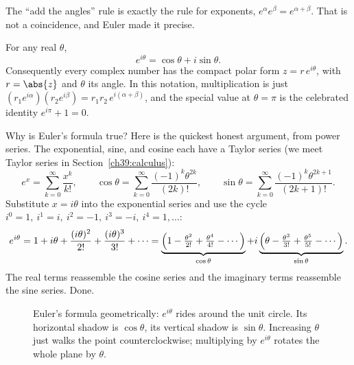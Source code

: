 The ``add the angles'' rule is exactly the rule for exponents, $e^\alpha e^\beta = e^{\alpha+\beta}$.
That is not a coincidence, and Euler made it precise.

\begin{formalbox}
For any real $\theta$,
\[
e^{i\theta} = \cos\theta + i\sin\theta.
\]
Consequently every complex number has the compact polar form $z = r\,e^{i\theta}$, with $r =
\abs{z}$ and $\theta$ its angle. In this notation, multiplication is just
$ (r_1 e^{i\alpha})(r_2 e^{i\beta}) = r_1 r_2\, e^{i(\alpha+\beta)}$, and the special value at
$\theta = \pi$ is the celebrated identity $e^{i\pi} + 1 = 0$.
\end{formalbox}

Why is Euler's formula true? Here is the quickest honest argument, from power series. The exponential,
sine, and cosine each have a Taylor series (we meet Taylor series in Section~\ref{ch39:calculus}):
\[
e^x = \sum_{k=0}^{\infty}\frac{x^k}{k!},\qquad
\cos\theta = \sum_{k=0}^{\infty}\frac{(-1)^k\theta^{2k}}{(2k)!},\qquad
\sin\theta = \sum_{k=0}^{\infty}\frac{(-1)^k\theta^{2k+1}}{(2k+1)!}.
\]
Substitute $x = i\theta$ into the exponential series and use the cycle $i^0=1,\ i^1=i,\ i^2=-1,\
i^3=-i,\ i^4 = 1,\dots$:
\[
e^{i\theta} = 1 + i\theta + \frac{(i\theta)^2}{2!} + \frac{(i\theta)^3}{3!} + \cdots
= \underbrace{\Bigl(1 - \tfrac{\theta^2}{2!} + \tfrac{\theta^4}{4!} - \cdots\Bigr)}_{\cos\theta}
+ i\underbrace{\Bigl(\theta - \tfrac{\theta^3}{3!} + \tfrac{\theta^5}{5!} - \cdots\Bigr)}_{\sin\theta}.
\]
The real terms reassemble the cosine series and the imaginary terms reassemble the sine series. Done.

\begin{figure}[H]
\centering
{}
\caption{Euler's formula geometrically: $e^{i\theta}$ rides around the unit circle. Its horizontal
shadow is $\cos\theta$, its vertical shadow is $\sin\theta$. Increasing $\theta$ just walks the point
counterclockwise; multiplying by $e^{i\theta}$ rotates the whole plane by $\theta$.}
\label{ch39:fig-euler}
\end{figure}

